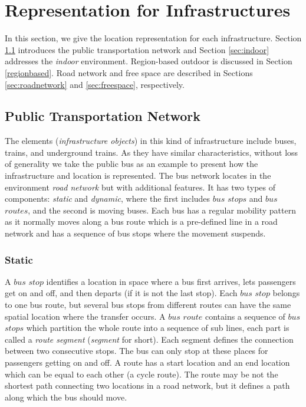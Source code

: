 \section{Representation for Infrastructures}
\label{sec:RfI}
In this section, we give the location representation for each infrastructure. Section \ref{publictn}
introduces the public transportation network and Section \ref{sec:indoor} addresses the \textit{indoor} environment. Region-based outdoor is discussed in Section \ref{regionbased}. Road network and free space are described in Sections \ref{sec:roadnetwork} and \ref{sec:freespace}, respectively. 

\subsection{Public Transportation Network}
\label{publictn}
The elements (\textit{infrastructure objects}) in this kind of infrastructure include buses, trains, and underground trains. 
As they have similar characteristics, without loss of generality we take the public bus as an example to present how the infrastructure and location is represented. The bus network locates in the environment \textit{road network} but with additional features. It has two types of components: 
\textit{static} and \textit{dynamic}, where the first includes $bus$ $stops$ and $bus$ $routes$, 
and the second is moving buses. Each bus has a regular mobility pattern as 
it normally moves along a bus route which is a pre-defined line in a road network and has a sequence of bus stops where the movement suspends. 
\subsubsection{Static}
\label{sec:static}
A $bus$ $stop$ identifies a location in space where a bus first arrives,
lets passengers get on and off, and then departs (if it is not the last stop). 
Each $bus$ $stop$ belongs to one bus route, but several bus stops from different routes 
can have the same spatial location where the transfer occurs. A $bus$ $route$ contains a sequence of 
$bus$ $stops$ which partition the whole route into a sequence of 
sub lines, each part is called a \textit{route segment} (\textit{segment} for short). 
Each segment defines the connection between 
two consecutive stops. The bus can only stop at these places for passengers getting
on and off. A route has a start location and an end location which can be equal to each other 
(a cycle route). The route may be not the shortest path connecting two locations in a
road network, but it defines a path along which the bus should move. \\

